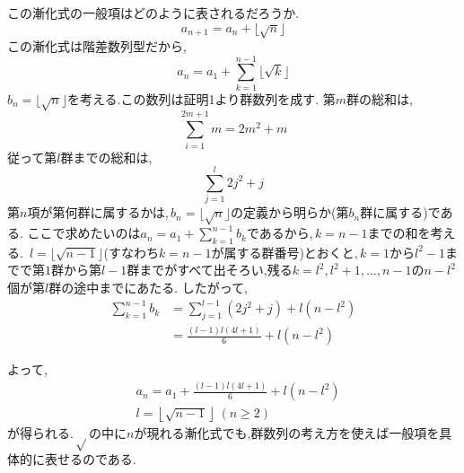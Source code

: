     この漸化式の一般項はどのように表されるだろうか.
    \[
      a_{n+1}=a_n+\lfloor \sqrt{n} \rfloor
    \]
    この漸化式は階差数列型だから,
    \[
      a_n=a_1+\sum_{k=1}^{n-1} \lfloor \sqrt{k} \rfloor
    \]
    $b_n=\lfloor \sqrt{n} \rfloor$を考える.この数列は証明1より群数列を成す.
    第$m$群の総和は,
    \[
      \sum_{i=1}^{2m+1} m=2m^2+m
    \]
    従って第$l$群までの総和は,
    \[
      \sum_{j=1}^{l}  2j^2+j
    \]
    第$n$項が第何群に属するかは,\,$b_n=\lfloor\sqrt n\rfloor$の定義から明らか(第$b_n$群に属する)である.
    ここで求めたいのは$a_n=a_1+\displaystyle\sum_{k=1}^{n-1}b_k$であるから,\,$k=n-1$までの和を考える.
    \,$l=\lfloor\sqrt{n-1}\rfloor$(すなわち$k=n-1$が属する群番号)とおくと,\,$k=1$から$l^2-1$までで第$1$群から第$l-1$群までがすべて出そろい,残る$k=l^2,l^2+1,\ldots,n-1$の$n-l^2$個が第$l$群の途中までにあたる.
    したがって,
    \begin{align*}
      \sum_{k=1}^{n-1}b_k&=\sum_{j=1}^{l-1}(2j^2+j)+l(n-l^2)\\
      &=\frac{(l-1)l(4l+1)}{6}+l(n-l^2)
    \end{align*}
      
    よって,
    \begin{align*}
      &a_n=a_1+\frac{(l-1)l(4l+1)}{6}+l(n-l^2)\\
      &l=\left\lfloor\sqrt{n-1}\right\rfloor\ (n\ge2)
    \end{align*}
    が得られる.\,$\sqrt{}$の中に$n$が現れる漸化式でも,群数列の考え方を使えば一般項を具体的に表せるのである.
